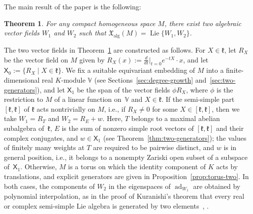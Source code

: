 \documentclass{article}
\newcommand{\frakk}{\mathfrak{k}}
\newcommand{\xalg}{\mathfrak X_{\mathrm{alg}}}
\newcommand{\sX}{\mathsf{X}}
\theoremstyle{definition}
\theoremstyle{plain}
\newtheorem{mainthm}{Theorem}
\begin{document}
The main result of the paper is the following:

\begin{mainthm}\label{thm:main}
For any compact homogeneous space $M$, there exist two algebraic vector fields $W_1$ and $W_2$ such that $\xalg(M)=\operatorname{Lie}\{W_1,W_2\}$.
\end{mainthm}




The two vector fields in Theorem~\ref{thm:main} are constructed as follows.
For $X\in\frakk$, let $R_X$ be the vector field on $M$ given by $R_X(x):=\frac{d}{dt} \big|_{t=0}e^{-tX}\cdot x$, and let $\sX_0:=\{R_X\mid X\in\frakk\}$.
We fix a suitable equivariant embedding of $M$ into a finite-dimensional real $K$-module $\mathbb V$ (see Sections~\ref{sec:degree-growth} and~\ref{sec:two-generators}), and let $\sX_1$ be the span of the vector fields $\phi R_X$, where $\phi$ is the restriction to $M$ of a linear function on~$\mathbb V$ and $X\in\frakk$.
If the semi-simple part $[\frakk,\frakk]$ of $\frakk$ acts nontrivially on $M$, i.e., if $R_X\neq0$ for some $X\in[\frakk,\frakk]$, then we take $W_1=R_T$ and $W_2=R_E+w$.
Here, $T$ belongs to a maximal abelian subalgebra of~$\frakk$, $E$ is the sum of nonzero simple root vectors of $[\frakk,\frakk]$ and their complex conjugates, and $w\in\sX_1$ (see Theorem~\ref{thm:two-generators}); the values of finitely many weights at $T$ are required to be pairwise distinct,
  and $w$ is in general position, i.e., it belongs to a nonempty Zariski open subset of a subspace of~$\sX_1$.
Otherwise, $M$ is a torus on which the identity component of $K$ acts by translations, and explicit generators are given in Proposition~\ref{prop:torus-two}.
In both cases, the components of $W_2$ in the eigenspaces of $\operatorname{ad}_{W_1}$ are obtained by polynomial interpolation, as in the proof of Kuranishi's theorem that every real or complex semi-simple Lie algebra is generated by two elements~\cite{Kuranishi49}, \cite[Theorem~6]{Kuranishi51}.
\end{document}
